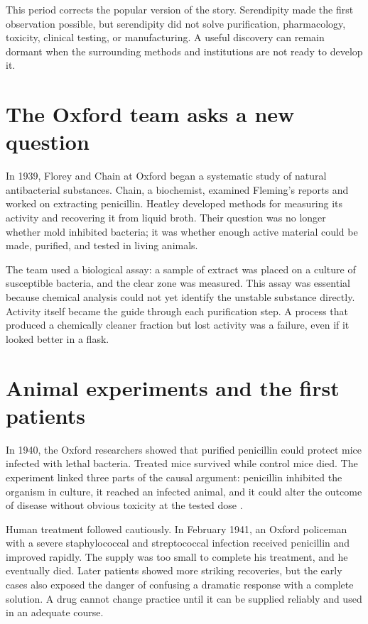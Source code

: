 \documentclass[12pt,oneside]{book}
\begin{document}
This period corrects the popular version of the story. Serendipity made the
first observation possible, but serendipity did not solve purification,
pharmacology, toxicity, clinical testing, or manufacturing. A useful discovery
can remain dormant when the surrounding methods and institutions are not ready
to develop it.

\section{The Oxford team asks a new question}
In 1939, Florey and Chain at Oxford began a systematic study of natural
antibacterial substances. Chain, a biochemist, examined Fleming's reports and
worked on extracting penicillin. Heatley developed methods for measuring its
activity and recovering it from liquid broth. Their question was no longer
whether mold inhibited bacteria; it was whether enough active material could be
made, purified, and tested in living animals.

The team used a biological assay: a sample of extract was placed on a culture
of susceptible bacteria, and the clear zone was measured. This assay was
essential because chemical analysis could not yet identify the unstable
substance directly. Activity itself became the guide through each purification
step. A process that produced a chemically cleaner fraction but lost activity
was a failure, even if it looked better in a flask.

\section{Animal experiments and the first patients}
In 1940, the Oxford researchers showed that purified penicillin could protect
mice infected with lethal bacteria. Treated mice survived while control mice
died. The experiment linked three parts of the causal argument: penicillin
inhibited the organism in culture, it reached an infected animal, and it could
alter the outcome of disease without obvious toxicity at the tested dose
\cite{antibioticEraReview}.

Human treatment followed cautiously. In February 1941, an Oxford policeman with
a severe staphylococcal and streptococcal infection received penicillin and
improved rapidly. The supply was too small to complete his treatment, and he
eventually died. Later patients showed more striking recoveries, but the early
cases also exposed the danger of confusing a dramatic response with a complete
solution. A drug cannot change practice until it can be supplied reliably and
used in an adequate course.
\end{document}
